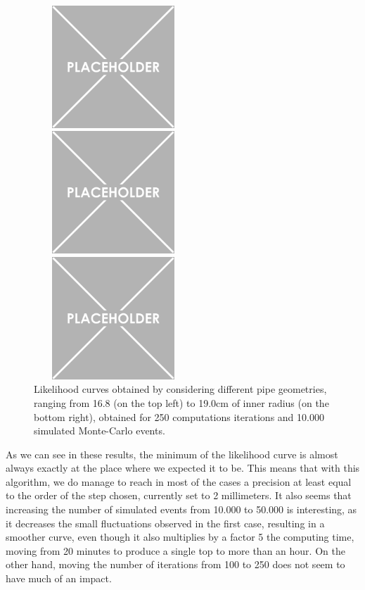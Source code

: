 \documentclass[a4paper, 11pt]{report}
\begin{document}
\begin{figure}[htbp]
\begin{minipage}[b]{.32\textwidth}
\includegraphics[width=6cm, height=4.6cm]{figs/placeholder.png}
\end{minipage}\hfill
\begin{minipage}[b]{.32\textwidth}
\includegraphics[width=6cm, height=4.6cm]{figs/placeholder.png}
\end{minipage} \hfill
\begin{minipage}[b]{.32\textwidth}
\includegraphics[width=6cm, height=4.6cm]{figs/placeholder.png}
\end{minipage} \hfill
\caption{Likelihood curves obtained by considering different pipe geometries, ranging from 16.8 (on the top left) to 19.0cm of inner radius (on the bottom right), obtained for 250 computations iterations and 10.000 simulated Monte-Carlo events.}
\label{fig:likelihoods3}
\end{figure}

As we can see in these results, the minimum of the likelihood curve is almost always exactly at the place where we expected it to be. This means that with this algorithm, we do manage to reach in most of the cases a precision at least equal to the order of the step chosen, currently set to 2 millimeters. It also seems that increasing the number of simulated events from 10.000 to 50.000 is interesting, as it decreases the small fluctuations observed in the first case, resulting in a smoother curve, even though it also multiplies by a factor 5 the computing time, moving from 20 minutes to produce a single top to more than an hour. On the other hand, moving the number of iterations from 100 to 250 does not seem to have much of an impact.
\end{document}
